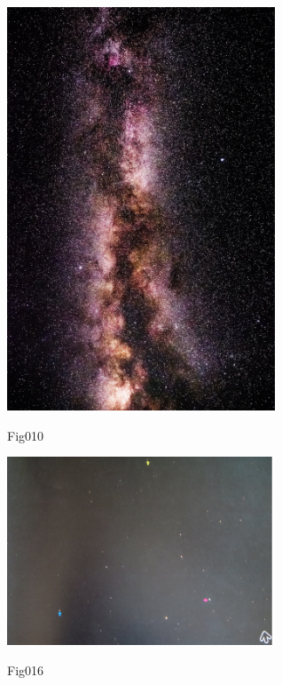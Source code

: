 \documentclass{jarticle}
\begin{document}
\begin{minipage}{5cm}
\includegraphics[width=8cm, angle=-90]{fig010.jpg}
\begin{center}
Fig010
\end{center}
\end{minipage}



\begin{minipage}{5cm}
\includegraphics[width=8cm, clip]{fig016.jpg}
\begin{center}
Fig016
\end{center}
\end{minipage}
\end{document}
